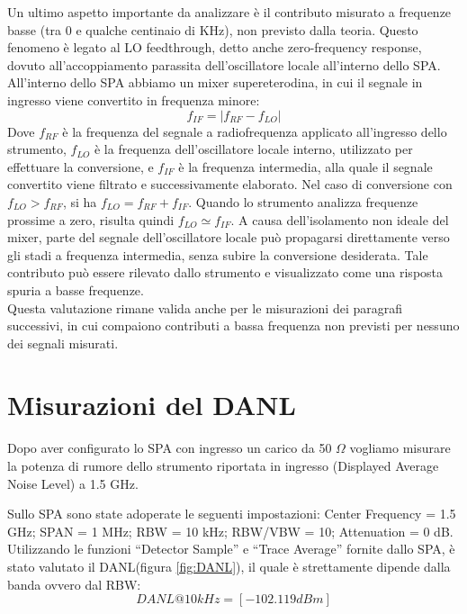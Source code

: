 \documentclass[11pt,a4paper,oneside]{book}
\begin{document}
Un ultimo aspetto importante da analizzare è il contributo misurato a frequenze basse (tra 0 e qualche centinaio di KHz), non previsto dalla teoria. Questo fenomeno è legato al LO feedthrough, detto anche zero-frequency response, dovuto
 all'accoppiamento parassita dell'oscillatore locale all'interno dello SPA.
All'interno dello SPA abbiamo un mixer supereterodina, in cui il segnale in ingresso viene convertito in frequenza minore:
\begin{equation}
    f_{IF} = |f_{RF} - f_{LO}|
\end{equation}
Dove $f_{RF}$ è la frequenza del segnale a radiofrequenza applicato all'ingresso dello strumento, $f_{LO}$ è la frequenza
 dell'oscillatore locale interno, utilizzato per effettuare la conversione, e $f_{IF}$ è la frequenza intermedia, alla quale
 il segnale convertito viene filtrato e successivamente elaborato. Nel caso di conversione con $f_{LO}>f_{RF}$, si ha
$f_{LO}=f_{RF}+f_{IF}$. Quando lo strumento analizza frequenze prossime a zero, risulta quindi $f_{LO}\simeq f_{IF}$.
A causa dell'isolamento non ideale del mixer, parte del segnale dell'oscillatore locale può propagarsi direttamente verso gli
stadi a frequenza intermedia, senza subire la conversione desiderata. Tale contributo può essere rilevato dallo strumento
e visualizzato come una risposta spuria a basse frequenze.
\\Questa valutazione rimane valida anche per le misurazioni dei paragrafi successivi, in cui compaiono contributi a
 bassa frequenza non previsti per nessuno dei segnali misurati.








\chapter{Misurazioni del DANL}
Dopo aver configurato lo SPA con ingresso un carico da 50 \(\Omega\) vogliamo misurare la potenza di rumore dello strumento riportata in ingresso (Displayed Average Noise Level) a 1.5 GHz.

Sullo SPA sono state adoperate le seguenti impostazioni: Center Frequency = 1.5 GHz; SPAN = 1 MHz; RBW = 10 kHz; RBW/VBW = 10; Attenuation = 0 dB. Utilizzando le funzioni “Detector Sample” e “Trace Average” fornite dallo SPA, è stato valutato il DANL(figura \ref{fig:DANL}), il quale è strettamente dipende dalla banda ovvero dal RBW:
\begin{equation}
DANL@10kHz = [-102.119 dBm]
\end{equation}
\end{document}
